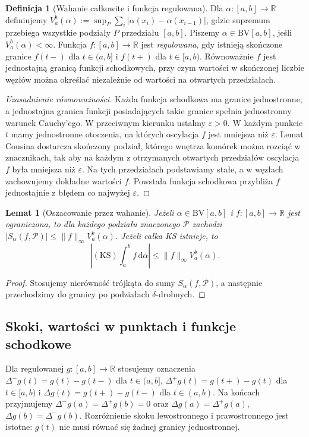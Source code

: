 \documentclass[11pt,a4paper]{article}
\numberwithin{equation}{section}
\theoremstyle{plain}
\newtheorem{lemat}[twierdzenie]{Lemat}
\theoremstyle{definition}
\newtheorem{definicja}[twierdzenie]{Definicja}
\theoremstyle{remark}
\newcommand{\R}{\mathbb R}
\newcommand{\BV}{\mathrm{BV}}
\newcommand{\KS}{\mathrm{KS}}
\begin{document}
\begin{definicja}[Wahanie całkowite i funkcja regulowana]
Dla $\alpha:[a,b]\to\R$ definiujemy $V_a^b(\alpha):=\sup_P\sum_i|\alpha(x_i)-\alpha(x_{i-1})|$, gdzie supremum przebiega wszystkie podziały $P$ przedziału $[a,b]$. Piszemy $\alpha\in\BV[a,b]$, jeśli $V_a^b(\alpha)<\infty$. Funkcja $f:[a,b]\to\R$ jest \emph{regulowana}, gdy istnieją skończone granice $f(t-)$ dla $t\in(a,b]$ i $f(t+)$ dla $t\in[a,b)$. Równoważnie $f$ jest jednostajną granicą funkcji schodkowych, przy czym wartości w skończonej liczbie węzłów można określać niezależnie od wartości na otwartych przedziałach.
\end{definicja}
\begin{proof}[Uzasadnienie równoważności]
Każda funkcja schodkowa ma granice jednostronne, a jednostajna granica funkcji posiadających takie granice spełnia jednostronny warunek Cauchy'ego. W przeciwnym kierunku ustalmy $\varepsilon>0$. W każdym punkcie $t$ mamy jednostronne otoczenia, na których oscylacja $f$ jest mniejsza niż $\varepsilon$. Lemat Cousina dostarcza skończony podział, którego wnętrza komórek można rozciąć w znacznikach, tak aby na każdym z otrzymanych otwartych przedziałów oscylacja $f$ była mniejsza niż $\varepsilon$. Na tych przedziałach podstawiamy stałe, a w węzłach zachowujemy dokładne wartości $f$. Powstała funkcja schodkowa przybliża $f$ jednostajnie z błędem co najwyżej $\varepsilon$.
\end{proof}

\begin{lemat}[Oszacowanie przez wahanie]
\label{lem:ks-var}
Jeżeli $\alpha\in\BV[a,b]$ i $f:[a,b]\to\R$ jest ograniczona, to dla każdego podziału znaczonego $\mathcal P$ zachodzi $|S_\alpha(f,\mathcal P)|\le\|f\|_\infty V_a^b(\alpha)$. Jeżeli całka KS istnieje, to
\[
 \left|(\KS)\int_a^b f\,\mathrm d\alpha\right|\le\|f\|_\infty V_a^b(\alpha).
\]
\end{lemat}
\begin{proof}
Stosujemy nierówność trójkąta do sumy $S_\alpha(f,\mathcal P)$, a następnie przechodzimy do granicy po podziałach $\delta$-drobnych.
\end{proof}

\subsection*{Skoki, wartości w punktach i funkcje schodkowe}
Dla regulowanej $g:[a,b]\to\R$ stosujemy oznaczenia $\Delta^-g(t)=g(t)-g(t-)$ dla $t\in(a,b]$, $\Delta^+g(t)=g(t+)-g(t)$ dla $t\in[a,b)$ i $\Delta g(t)=g(t+)-g(t-)$ dla $t\in(a,b)$. Na końcach przyjmujemy $\Delta^-g(a)=\Delta^+g(b)=0$ oraz $\Delta g(a)=\Delta^+g(a)$, $\Delta g(b)=\Delta^-g(b)$. Rozróżnienie skoku lewostronnego i prawostronnego jest istotne: $g(t)$ nie musi równać się żadnej granicy jednostronnej.
\end{document}
